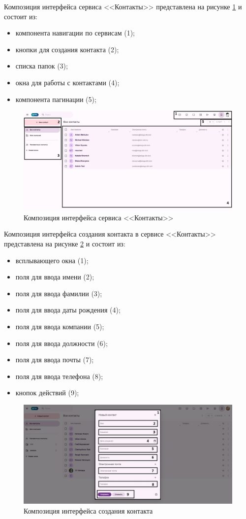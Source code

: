 Композиция интерфейса сервиса <<Контакты>> представлена на рисунке \ref{templ:image5} и состоит из:
\begin{itemize}
  \item компонента навигации по сервисам (1);
  \item кнопки для создания контакта (2);
  \item списка папок (3);
  \item окна для работы с контактами (4);
  \item компонента пагинации (5);
\end{itemize}
\begin{figure}[H]
	\centering
	\includegraphics[width=1\linewidth]{images/контакты}
	\caption{Композиция интерфейса сервиса <<Контакты>>}
	\label{templ:image5}
\end{figure}

Композиция интерфейса создания контакта в сервисе <<Контакты>> представлена на рисунке \ref{templ:image5b} и состоит из:
\begin{itemize}
  \item всплывающего окна (1);
  \item поля для ввода имени (2);
  \item поля для ввода фамилии (3);
  \item поля для ввода даты рождения (4);
  \item поля для ввода компании (5);
  \item поля для ввода должности (6);
  \item поля для ввода почты (7);
  \item поля для ввода телефона (8);
  \item кнопок действий (9);
\end{itemize}
\begin{figure}[H]
	\centering
	\includegraphics[width=1\linewidth]{images/контакты2}
	\caption{Композиция интерфейса создания контакта}
	\label{templ:image5b}
\end{figure}

